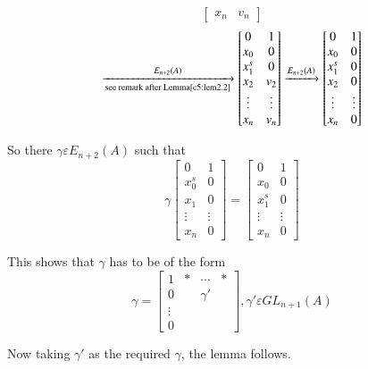 \begin{Proof}
$$\begin{bmatrix}
x_n & v_n
\end{bmatrix}
$$
$$
\xrightarrow[\text{see remark
after Lemma\ref{c5:lem2.2}}]{E_{n+2}(A)}
\begin{bmatrix}
0 & 1\\
x_0 & 0\\
x^{s}_1 & 0\\
x_2 & v_2\\
\vdots & \vdots\\
x_n & v_n
\end{bmatrix} \xrightarrow{E_{n+2}(A)}
\begin{bmatrix}
0 &  1\\
x_0 & 0\\
x^{s}_1 &  0\\
x_2 & 0\\
\vdots & \vdots\\
x_n &  0
\end{bmatrix}
$$

So there $\gamma \varepsilon E_{n+2}(A)$ such that 
$$
\gamma
\begin{bmatrix}
0 & 1\\
x^{s}_0 & 0\\
x_1 & 0\\
\vdots &  \vdots\\
x_n & 0
\end{bmatrix} = \begin{bmatrix}
0 & 1\\
x_0 & 0\\
x^{s}_1 & 0\\
\vdots &  \vdots\\
x_n & 0
\end{bmatrix}
$$

This shows that $\gamma$ has to be of the form 
$$
\gamma=
\begin{bmatrix}
1 & \ast & \cdots & \ast\\
0 & & \gamma'&\\
\vdots & &  &\\
0 & & &
\end{bmatrix}, \gamma' \varepsilon GL_{n+1}(A)
$$

Now taking $\gamma'$ as the required $\gamma$, the lemma follows.


\end{Proof}
